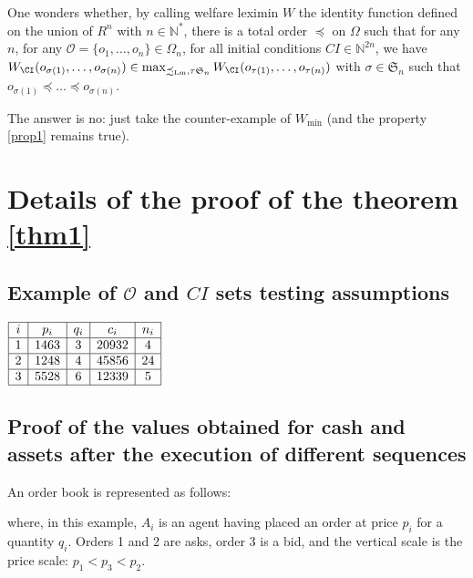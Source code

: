 \documentclass[a4paper]{article}
\newcommand{\N}{\mathbb{N}}
\newcommand{\Sg}{\mathfrak{S}}
\newcommand{\Oc}{\mathcal{O}}
\newcommand{\Lms}{\precsim_\mathrm{Lm}}
\newtheorem[style=S, bodystyle=\noindent]{thm}{Theorem}[section]
\newtheorem[style=S, bodystyle=\noindent]{defn}[thm]{Definition}
\newtheorem[style=S, bodystyle=\noindent]{propo}[thm]{Proposition}
\newtheorem[style=S, bodystyle=\noindent]{prop}[thm]{Property}
\newtheorem[style=S, bodystyle=\noindent]{coro}[thm]{Corollary}
\newtheorem[style=S, bodystyle=\noindent]{lem}[thm]{Lemma}
\newtheorem[style=S, headstyle=\bfseries\boldmath Theorem, bodystyle=\noindent]{thm*}{Theorem}
\newtheorem[style=S, headstyle=\bfseries\boldmath Definition, bodystyle=\noindent]{defn*}{Definition}
\newtheorem[style=S, headstyle=\bfseries\boldmath Proposition, bodystyle=\noindent]{propo*}{Proposition}
\newtheorem[style=S, headstyle=\bfseries\boldmath Property, bodystyle=\noindent]{prop*}{Property}
\newtheorem[style=S, headstyle=\bfseries\boldmath Corollary, bodystyle=\noindent]{coro*}{Corollary}
\newtheorem[style=S, headstyle=\bfseries\boldmath Lemma, bodystyle=\noindent]{lem*}{Lemma}
\begin{document}
\par
One wonders whether, by calling welfare leximin $W$ the identity function defined on the union of $R^n$ with $n\in\N^*$, there is a total order $\preceq$ on $\Omega$ such that for any $n$, for any $\Oc = \{o_1,\ldots,o_n\}\in\Omega_n$, for all initial conditions $CI\in\N^{2n}$, we have $W_{\CI}(o_{\sigma(1)},\ldots,o_{\sigma(n)}) \in \max_{\Lms, \tau \Sg_n}W_{\CI}(o_{\tau(1)}, \ldots, o_{\tau(n)})$ with $\sigma \in \Sg_n$ such that $o_{\sigma(1)} \preceq \ldots \preceq o_{\sigma(n)}$.

The answer is no: just take the counter-example of $W_{\min}$ (and the property \ref{prop1} remains true).

\newpage
\appendix

\section{Details of the proof of the theorem \ref{thm1}}

\subsection{Example of $\Oc$ and $CI$ sets testing assumptions}
\label{appendix1}
\begin{center}
$\begin{array}{|c|c|c|c|c|}
	\hline
	i & p_i & q_i & c_i & n_i \\
	\hline
	1 & 1463 & 3 & 20932 & 4 \\
	\hline
	2 & 1248 & 4 & 45856 & 24 \\
	\hline
	3 & 5528 & 6 & 12339 & 5 \\
	\hline
\end{array}$
\end{center}

\subsection{Proof of the values obtained for cash and assets after the execution of different sequences}
\label{appendix2}

\par
An order book is represented as follows:
\begin{center}
\end{center}
where, in this example, $A_i$ is an agent having placed an order at price $p_i$ for a quantity $q_i$. Orders 1 and 2 are asks, order 3 is a bid, and the vertical scale is the price scale: $p_1 < p_3 < p_2$.
\end{document}
